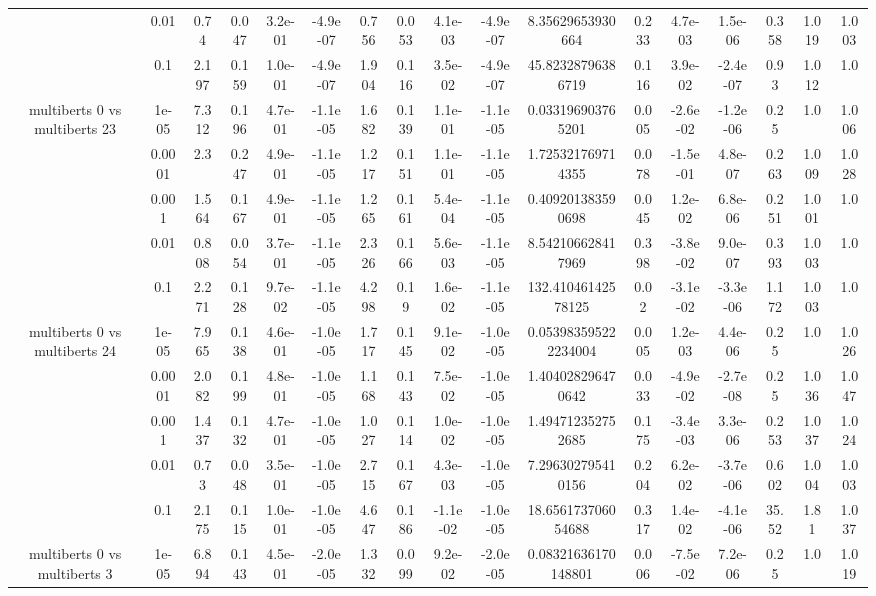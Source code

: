 \begin{tabular}{|c|c|c|c|c|c|c|c|c|c|c|c|c|c|c|c|c|}
 & 0.01 & 0.74 & 0.047 & 3.2e-01 & -4.9e-07 & 0.756 & 0.053 & 4.1e-03 & -4.9e-07 & 8.35629653930664 & 0.233 & 4.7e-03 & 1.5e-06 & 0.358 & 1.019 & 1.003 \\
 & 0.1 & 2.197 & 0.159 & 1.0e-01 & -4.9e-07 & 1.904 & 0.116 & 3.5e-02 & -4.9e-07 & 45.82328796386719 & 0.116 & 3.9e-02 & -2.4e-07 & 0.93 & 1.012 & 1.0 \\
\hline
\multirow{5}{*}{multiberts 0 vs multiberts 23} & 1e-05 & 7.312 & 0.196 & 4.7e-01 & -1.1e-05 & 1.682 & 0.139 & 1.1e-01 & -1.1e-05 & 0.033196903765201 & 0.005 & -2.6e-02 & -1.2e-06 & 0.25 & 1.0 & 1.006 \\
 & 0.0001 & 2.3 & 0.247 & 4.9e-01 & -1.1e-05 & 1.217 & 0.151 & 1.1e-01 & -1.1e-05 & 1.725321769714355 & 0.078 & -1.5e-01 & 4.8e-07 & 0.263 & 1.009 & 1.028 \\
 & 0.001 & 1.564 & 0.167 & 4.9e-01 & -1.1e-05 & 1.265 & 0.161 & 5.4e-04 & -1.1e-05 & 0.409201383590698 & 0.045 & 1.2e-02 & 6.8e-06 & 0.251 & 1.001 & 1.0 \\
 & 0.01 & 0.808 & 0.054 & 3.7e-01 & -1.1e-05 & 2.326 & 0.166 & 5.6e-03 & -1.1e-05 & 8.542106628417969 & 0.398 & -3.8e-02 & 9.0e-07 & 0.393 & 1.003 & 1.0 \\
 & 0.1 & 2.271 & 0.128 & 9.7e-02 & -1.1e-05 & 4.298 & 0.19 & 1.6e-02 & -1.1e-05 & 132.41046142578125 & 0.02 & -3.1e-02 & -3.3e-06 & 1.172 & 1.003 & 1.0 \\
\hline
\multirow{5}{*}{multiberts 0 vs multiberts 24} & 1e-05 & 7.965 & 0.138 & 4.6e-01 & -1.0e-05 & 1.717 & 0.145 & 9.1e-02 & -1.0e-05 & 0.053983595222234004 & 0.005 & 1.2e-03 & 4.4e-06 & 0.25 & 1.0 & 1.026 \\
 & 0.0001 & 2.082 & 0.199 & 4.8e-01 & -1.0e-05 & 1.168 & 0.143 & 7.5e-02 & -1.0e-05 & 1.404028296470642 & 0.033 & -4.9e-02 & -2.7e-08 & 0.25 & 1.036 & 1.047 \\
 & 0.001 & 1.437 & 0.132 & 4.7e-01 & -1.0e-05 & 1.027 & 0.114 & 1.0e-02 & -1.0e-05 & 1.494712352752685 & 0.175 & -3.4e-03 & 3.3e-06 & 0.253 & 1.037 & 1.024 \\
 & 0.01 & 0.73 & 0.048 & 3.5e-01 & -1.0e-05 & 2.715 & 0.167 & 4.3e-03 & -1.0e-05 & 7.296302795410156 & 0.204 & 6.2e-02 & -3.7e-06 & 0.602 & 1.004 & 1.003 \\
 & 0.1 & 2.175 & 0.115 & 1.0e-01 & -1.0e-05 & 4.647 & 0.186 & -1.1e-02 & -1.0e-05 & 18.656173706054688 & 0.317 & 1.4e-02 & -4.1e-06 & 35.52 & 1.81 & 1.037 \\
\hline
\multirow{5}{*}{multiberts 0 vs multiberts 3} & 1e-05 & 6.894 & 0.143 & 4.5e-01 & -2.0e-05 & 1.332 & 0.099 & 9.2e-02 & -2.0e-05 & 0.08321636170148801 & 0.006 & -7.5e-02 & 7.2e-06 & 0.25 & 1.0 & 1.019 \\

\end{tabular}
